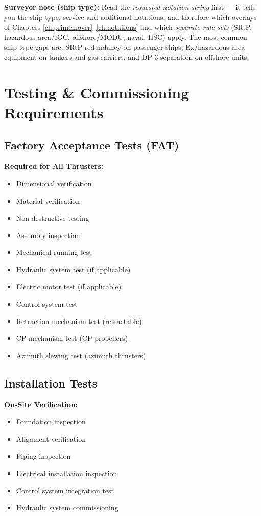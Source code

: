 \documentclass[11pt,a4paper]{report}
\begin{document}
\noindent\textbf{Surveyor note (ship type):} Read the \emph{requested notation
string} first --- it tells you the ship type, service and additional notations,
and therefore which overlays of Chapters
\ref{ch:primemover}--\ref{ch:notations} and which \emph{separate rule sets}
(SRtP, hazardous-area/IGC, offshore/MODU, naval, HSC) apply. The most common
ship-type gaps are: SRtP redundancy on passenger ships, Ex/hazardous-area
equipment on tankers and gas carriers, and DP-3 separation on offshore units.

\newpage

\chapter{Testing \& Commissioning Requirements}
\label{ch:testing}

\section{Factory Acceptance Tests (FAT)}

\textbf{Required for All Thrusters:}
\begin{itemize}[leftmargin=*]
\item Dimensional verification
\item Material verification
\item Non-destructive testing
\item Assembly inspection
\item Mechanical running test
\item Hydraulic system test (if applicable)
\item Electric motor test (if applicable)
\item Control system test
\item Retraction mechanism test (retractable)
\item CP mechanism test (CP propellers)
\item Azimuth slewing test (azimuth thrusters)
\end{itemize}

\section{Installation Tests}

\textbf{On-Site Verification:}
\begin{itemize}[leftmargin=*]
\item Foundation inspection
\item Alignment verification
\item Piping inspection
\item Electrical installation inspection
\item Control system integration test
\item Hydraulic system commissioning
\end{itemize}
\end{document}
